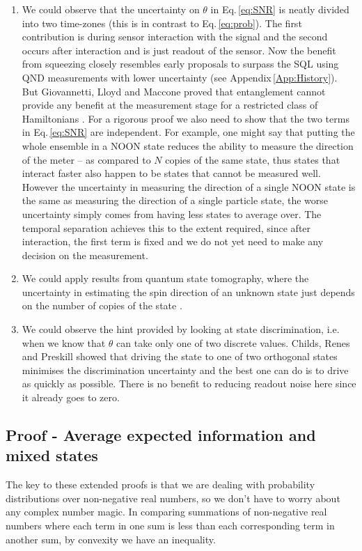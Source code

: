 \documentclass[reqno]{amsart}
\begin{document}
\begin{enumerate}
\item We could observe that the uncertainty on $\theta$ in Eq.\,\eqref{eq:SNR} is neatly divided into two time-zones (this is in contrast to Eq.\,\eqref{eq:prob}). The first contribution is during sensor interaction with the signal and the second occurs after interaction and is just readout of the sensor. Now the benefit from squeezing closely resembles early proposals to surpass the SQL using QND measurements with lower uncertainty (see Appendix\,\ref{App:History}). But Giovannetti, Lloyd and Maccone proved that entanglement cannot provide any benefit at the measurement stage for a restricted class of Hamiltonians \cite{Giovannetti2006}. For a rigorous proof we also need to show that the two terms in Eq.\,\eqref{eq:SNR} are independent. For example, one might say that putting the whole ensemble in a NOON state reduces the ability to measure the direction of the meter -- as compared to $N$ copies of the same state, thus states that interact faster also happen to be states that cannot be measured well. However the uncertainty in measuring the direction of a single NOON state is the same as measuring the direction of a single particle state, the worse uncertainty simply comes from having less states to average over. The temporal separation achieves this to the extent required, since after interaction, the first term is fixed and we do not yet need to make any decision on the measurement.

\item We could apply results from quantum state tomography, where the uncertainty in estimating the spin direction of an unknown state just depends on the number of copies of the state \cite{ODonnell2016, Aaronson2018}.

\item We could observe the hint provided by looking at state discrimination, i.e. when we know that $\theta$ can take only one of two discrete values. Childs, Renes and Preskill \cite{Childs2000} showed that driving the state to one of two orthogonal states minimises the discrimination uncertainty and the best one can do is to drive as quickly as possible. There is no benefit to reducing readout noise here since it already goes to zero.\\
\end{enumerate}

\subsection{Proof - Average expected information and mixed states}\label{App:Mixed}
The key to these extended proofs is that we are dealing with probability distributions over non-negative real numbers, so we don't have to worry about any complex number magic. In comparing summations of non-negative real numbers where each term in one sum is less than each corresponding term in another sum, by convexity we have an inequality.\\
\end{document}
